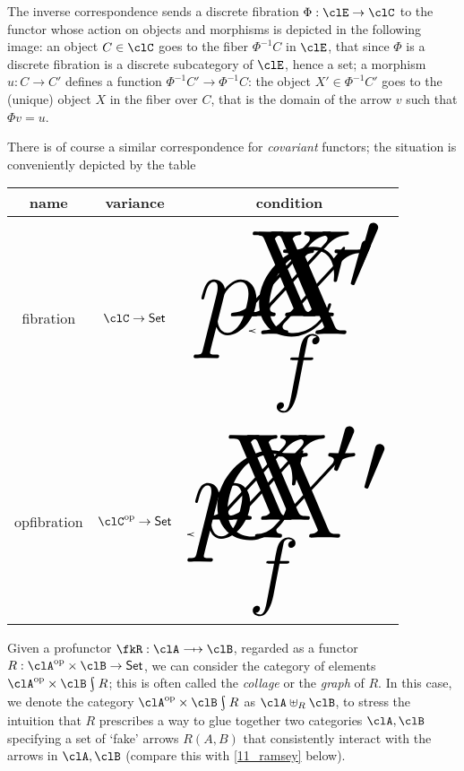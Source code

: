 The inverse correspondence sends a discrete fibration $\Phi : \clE \to \clC$ to the functor whose action on objects and morphisms is depicted in the following image: an object $C\in\clC$ goes to the fiber $\Phi^{-1}C$ in $\clE$, that since $\Phi$ is a discrete fibration is a discrete subcategory of $\clE$, hence a set; a morphism $u : C\to C'$ defines a function $\Phi^{-1}C' \to \Phi^{-1}C$: the object $X'\in\Phi^{-1}C'$ goes to the (unique) object $X$ in the fiber over $C$, that is the domain of the arrow $v$ such that $\Phi v=u$.
\begin{center}
\end{center}
There is of course a similar correspondence for \emph{covariant} functors; the situation is conveniently depicted by the table
\begin{center}
  \begin{tabular}{ccc}
    \textbf{name}       & \textbf{variance}   & \textbf{condition} \\ \toprule
    fibration           & $\clC\to\Set$       &
    $
      \vcenter{\tiny \xymatrix@R=5mm{
    X \ar[r] \ar@{.}[d] & X'\ar@{.}[d]                             \\ \midrule
    pX \ar[r]_f         & C'
      }}
    $
    \\ \midrule
    opfibration         & $\clC^\op \to \Set$ &
    $
      \vcenter{\tiny \xymatrix@R=5mm{
    X \ar[r] \ar@{.}[d] & X'\ar@{.}[d]                             \\ \midrule
    C \ar[r]_f          & pX'
      }}
    $
    \\ \bottomrule
  \end{tabular}
\end{center}
\begin{corollary}\label{da_collage}
  Given a profunctor $\fkR : \clA \pto \clB$, regarded as a functor $R : \clA^\op\times \clB \to \Set$, we can consider the category of elements $\elts{\clA^\op\times\clB}{R}$; this is often called the \emph{collage} or the \emph{graph} of $R$. In this case, we denote the category $\elts{\clA^\op\times\clB}{R}$ as $\clA\uplus_R\clB$, to stress the intuition that $R$ prescribes a way to glue together two categories $\clA,\clB$ specifying a set of `fake' arrows $R(A,B)$ that consistently interact with the arrows in $\clA,\clB$ (compare this with \autoref{11_ramsey} below).
\end{corollary}
